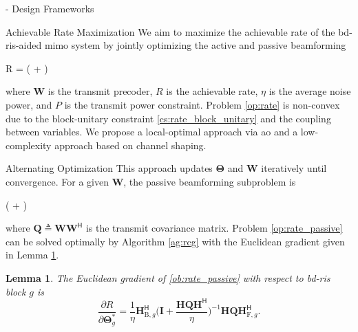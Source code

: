 \documentclass[journal]{IEEEtran}
\newtheorem{lemma}{Lemma}
\begin{document}
\begin{section}{- Design Frameworks}
	\begin{subsection}{Achievable Rate Maximization}\label{sc:rate}
		We aim to maximize the achievable rate of the \gls{bd}-\gls{ris}-aided \gls{mimo} system by jointly optimizing the active and passive beamforming
		\begin{maxi!}
			{}{R = \log \det \biggl( + \biggr)}{\label{op:rate}}{\label{ob:rate}}
		\end{maxi!}
		where $\mathbf{W}$ is the transmit precoder, $R$ is the achievable rate, $\eta$ is the average noise power, and $P$ is the transmit power constraint.
		Problem \eqref{op:rate} is non-convex due to the block-unitary constraint \eqref{cs:rate_block_unitary} and the coupling between variables.
		We propose a local-optimal approach via \gls{ao} and a low-complexity approach based on channel shaping.

		\begin{subsubsection}{Alternating Optimization}
			This approach updates $\mathbf{\Theta}$ and $\mathbf{W}$ iteratively until convergence.
			For a given $\mathbf{W}$, the passive beamforming subproblem is
			\begin{maxi!}
				{\scriptstyle{\mathbf{\Theta}}}{\log \det \biggl( + \biggr)}{\label{op:rate_passive}}{\label{ob:rate_passive}}
				\addConstraint{\mathbf{\Theta}_g^\mathsf{H} \mathbf{\Theta}_g=\mathbf{I}, \quad \forall g,}{}{}
			\end{maxi!}
			where $\mathbf{Q} \triangleq \mathbf{W} \mathbf{W}^\mathsf{H}$ is the transmit covariance matrix.
			Problem \eqref{op:rate_passive} can be solved optimally by Algorithm \ref{ag:rcg} with the Euclidean gradient given in Lemma \ref{lm:rate_gradient}.
			\begin{lemma}\label{lm:rate_gradient}
				The Euclidean gradient of \eqref{ob:rate_passive} with respect to \gls{bd}-\gls{ris} block $g$ is
				\begin{equation}
					\frac{\partial R}{\partial \mathbf{\Theta}_g^*} = \frac{1}{\eta} \mathbf{H}_{\mathrm{B},g}^\mathsf{H} \biggl(\mathbf{I} + \frac{\mathbf{H}\mathbf{Q}\mathbf{H}^\mathsf{H}}{\eta}\biggr)^{-1} \mathbf{H} \mathbf{Q} \mathbf{H}_{\mathrm{F},g}^\mathsf{H}.
					\label{eq:rate_gradient}
				\end{equation}
			\end{lemma}


\end{subsubsection}
\end{subsection}
\end{section}
\end{document}
